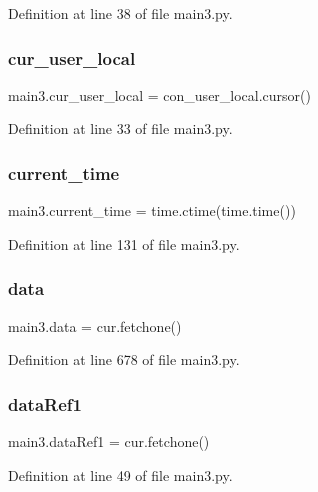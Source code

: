 Definition at line 38 of file main3.\+py.

\mbox{\label{namespacemain3_a2fa22d0a5dd912937396dd96363ff968}} 
\subsubsection{cur\+\_\+user\+\_\+local}
{\footnotesize\ttfamily main3.\+cur\+\_\+user\+\_\+local = con\+\_\+user\+\_\+local.\+cursor()}



Definition at line 33 of file main3.\+py.

\mbox{\label{namespacemain3_aa03fad60889e4cdf61e6898d8ef9617e}} 
\subsubsection{current\+\_\+time}
{\footnotesize\ttfamily main3.\+current\+\_\+time = time.\+ctime(time.\+time())}



Definition at line 131 of file main3.\+py.

\mbox{\label{namespacemain3_af3b593054c807ee934bbbca0f4964a15}} 
\subsubsection{data}
{\footnotesize\ttfamily main3.\+data = cur.\+fetchone()}



Definition at line 678 of file main3.\+py.

\mbox{\label{namespacemain3_a49b33cac6f362fbef2ac40a65b883fde}} 
\subsubsection{data\+Ref1}
{\footnotesize\ttfamily main3.\+data\+Ref1 = cur.\+fetchone()}



Definition at line 49 of file main3.\+py.

\mbox{\label{namespacemain3_a5c3879d90e71304ff78e672fe925e10a}} 
